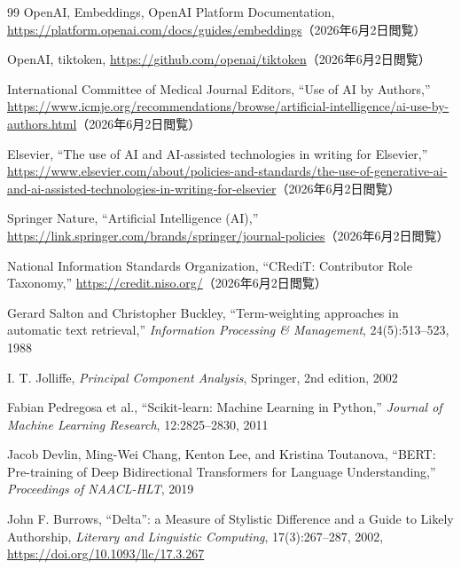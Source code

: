 \documentclass[uplatex,dvipdfmx,11pt,a4paper]{jsarticle}
\begin{document}
\begin{thebibliography}{99}
OpenAI,
\newblock Embeddings, OpenAI Platform Documentation,
\newblock \url{https://platform.openai.com/docs/guides/embeddings}（2026年6月2日閲覧）

OpenAI,
\newblock tiktoken,
\newblock \url{https://github.com/openai/tiktoken}（2026年6月2日閲覧）

International Committee of Medical Journal Editors,
\newblock ``Use of AI by Authors,''
\newblock \url{https://www.icmje.org/recommendations/browse/artificial-intelligence/ai-use-by-authors.html}（2026年6月2日閲覧）

Elsevier,
\newblock ``The use of AI and AI-assisted technologies in writing for Elsevier,''
\newblock \url{https://www.elsevier.com/about/policies-and-standards/the-use-of-generative-ai-and-ai-assisted-technologies-in-writing-for-elsevier}（2026年6月2日閲覧）

Springer Nature,
\newblock ``Artificial Intelligence (AI),''
\newblock \url{https://link.springer.com/brands/springer/journal-policies}（2026年6月2日閲覧）

National Information Standards Organization,
\newblock ``CRediT: Contributor Role Taxonomy,''
\newblock \url{https://credit.niso.org/}（2026年6月2日閲覧）

Gerard Salton and Christopher Buckley,
\newblock ``Term-weighting approaches in automatic text retrieval,''
\newblock \textit{Information Processing \& Management}, 24(5):513--523, 1988

I. T. Jolliffe,
\newblock \textit{Principal Component Analysis},
\newblock Springer, 2nd edition, 2002

Fabian Pedregosa et al.,
\newblock ``Scikit-learn: Machine Learning in Python,''
\newblock \textit{Journal of Machine Learning Research}, 12:2825--2830, 2011

Jacob Devlin, Ming-Wei Chang, Kenton Lee, and Kristina Toutanova,
\newblock ``BERT: Pre-training of Deep Bidirectional Transformers for Language Understanding,''
\newblock \textit{Proceedings of NAACL-HLT}, 2019

John F. Burrows,
\newblock ``Delta'': a Measure of Stylistic Difference and a Guide to Likely Authorship,
\newblock \textit{Literary and Linguistic Computing}, 17(3):267--287, 2002,
\newblock \url{https://doi.org/10.1093/llc/17.3.267}


\end{thebibliography}
\end{document}
